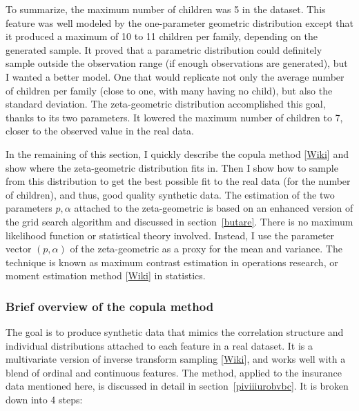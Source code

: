 \documentclass[oneside,10pt]{book}
\begin{document}
To summarize, the maximum number of children was 5 in the dataset. This feature was well modeled by the one-parameter geometric distribution except that it produced a maximum of 10 to 11 children per family, depending on the generated sample. It proved that a parametric distribution 
 could definitely sample outside the observation range (if enough observations are generated), but I wanted a better model. One that would replicate not only the average number of children per family (close to one, with many having no child), but also the standard deviation. The zeta-geometric distribution accomplished this goal, thanks to its two parameters. It lowered the maximum number of 
 children to 7, closer to the observed value in the real data.

In the remaining of this section, I quickly describe the 
\textcolor{index}{copula method} [\href{https://en.wikipedia.org/wiki/Copula_(probability_theory)}{Wiki}] and show where the zeta-geometric distribution fits in. Then
 I show how to sample from this distribution to get the best possible fit to the real data (for the number of children), and thus, good quality synthetic data. The estimation of the two parameters $p,\alpha$ attached to the zeta-geometric is based on an enhanced version of the \textcolor{index}{grid search algorithm} and discussed in section~\ref{butare}. There is no maximum likelihood function or statistical theory involved.
 Instead, I use the parameter vector $(p, \alpha)$ of the zeta-geometric as a proxy for the mean and variance. The technique is known
 as \textcolor{index}{maximum contrast estimation} in operations research, or  
\textcolor{index}{moment estimation method} [\href{https://en.wikipedia.org/wiki/Generalized_method_of_moments}{Wiki}]
 in statistics.

\subsubsection{Brief overview of the copula method}\label{chaleur}

The goal is to produce  synthetic data that mimics the correlation structure and individual distributions attached to each feature in a real dataset. It is a multivariate version of  
\textcolor{index}{inverse transform sampling} [\href{https://en.wikipedia.org/wiki/Inverse_transform_sampling}{Wiki}], and works well with a blend of ordinal and continuous features.
 The method, applied to the insurance data mentioned here, is discussed in detail in section~\ref{piviiiurobvbc}.
 It is broken down into 4 steps:\vspace{1ex}
\end{document}
